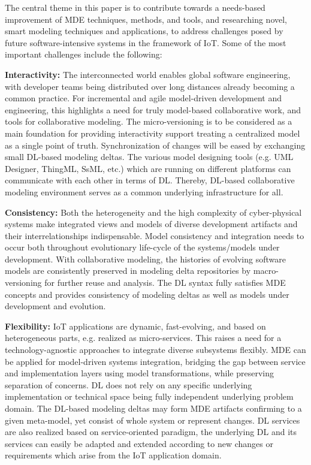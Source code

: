 The central theme in this paper is to contribute towards a needs-based improvement of MDE techniques, methods, and tools, and researching novel, smart modeling techniques and applications, to address challenges posed by future software-intensive systems in the framework of IoT. Some of the most important challenges include the following:

\textbf{Interactivity:} The interconnected world enables global software engineering, with developer teams being distributed over long distances already becoming a common practice. For incremental and agile model-driven development and engineering, this highlights a need for truly model-based collaborative work, and tools for collaborative modeling. The micro-versioning is to be considered as a main foundation for providing interactivity support treating a centralized model as a single point of truth. Synchronization of changes will be eased by exchanging small DL-based modeling deltas. The various model designing tools (e.g. UML Designer, ThingML, SsML, etc.) which are running on different platforms can communicate with each other in terms of DL. Thereby, DL-based collaborative modeling environment serves as a common underlying infrastructure for all. 

\textbf{Consistency:} Both the heterogeneity and the high complexity of cyber-physical systems make integrated views and models of diverse development artifacts and their interrelationships indispensable. Model consistency and integration needs to occur both throughout evolutionary life-cycle of the systems/models under development. With collaborative modeling, the histories of evolving software models are consistently preserved in modeling delta repositories by macro-versioning for further reuse and analysis. The DL syntax fully satisfies MDE concepts and provides consistency of modeling deltas as well as models under development and evolution.

\textbf{Flexibility:} IoT applications are dynamic, fast-evolving, and based on heterogeneous parts, e.g. realized as micro-services. This raises a need for a technology-agnostic approaches to integrate diverse subsystems flexibly. MDE can be applied for model-driven systems integration, bridging the gap between service and implementation layers using model transformations, while preserving separation of concerns. DL does not rely on any specific underlying implementation or technical space being fully independent underlying problem domain. The DL-based modeling deltas may form MDE artifacts confirming to a given meta-model, yet consist of whole system or represent changes. DL services are also realized based on service-oriented paradigm, the underlying DL and its services can easily be adapted and extended according to new changes or requirements which arise from the IoT application domain. 